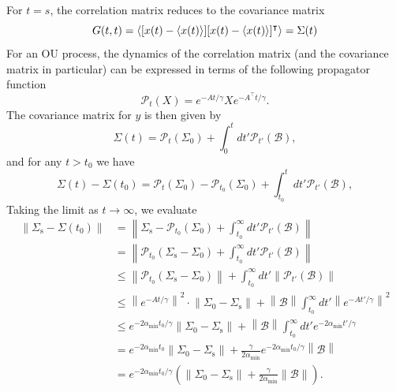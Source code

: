 \documentclass[prx,onecolumn,floatfix,longbibliography,notitlepage, nofootinbib,12pt]{revtex4-2}
\renewcommand{\leq}{\leqslant}
\begin{document}
\begin{appendix}
For $t=s$, the correlation matrix reduces to the covariance matrix
\begin{equation}
    G(t,t) = \braket{[x(t) - \braket{x(t)}][x(t) - \braket{x(t)}]^\intercal} = \Sigma(t)
\end{equation}
For an OU process, the dynamics of the correlation matrix (and the covariance matrix in particular) can be expressed in terms of the following propagator function
\begin{equation}
    \mathcal{P}_t(X) = e^{-A t/\gamma} X e^{-A^\intercal t/\gamma}.
\end{equation}
The covariance matrix for $y$ is then given by
\begin{equation}
\label{sigma-time-dep-app}
    \Sigma(t) = \mathcal{P}_t(\Sigma_0) + \int_0^t dt' \mathcal{P}_{t'} (\mathcal{B}),
\end{equation}
and for any $t > t_0$ we have
\begin{equation}
\label{sigma-error-time-dep-app}
    \Sigma(t) - \Sigma(t_0)=\mathcal{P}_{t}(\Sigma_0) -\mathcal{P}_{t_0}(\Sigma_0) + \int_{t_0}^{t} dt' \mathcal{P}_{t'} (\mathcal{B}),
\end{equation}
Taking the limit as $t \to \infty$, we evaluate
\begin{align}
    \left\|\Sigma_\text{s} - \Sigma(t_0) \right\| &= \left\| \Sigma_\text{s} -\mathcal{P}_{t_0}(\Sigma_0) + \int_{t_0}^{\infty} dt' \mathcal{P}_{t'} (\mathcal{B})\right\| \\
    & =  \left\|\mathcal{P}_{t_0}( \Sigma_\text{s} - \Sigma_0) + \int_{t_0}^{\infty} dt' \mathcal{P}_{t'} (\mathcal{B})\right\| \\
    & \leq
 \left\| \mathcal{P}_{t_0} (\Sigma_\text{s} - \Sigma_0) \right\|+ \int_{t_0}^\infty dt' \left\| \mathcal{P}_{t'}(\mathcal{B})\right\|\\
 & \leq 
  \left\| e^{-A t/\gamma}\right\|^2 \cdot \left\| \Sigma_0 - \Sigma_\text{s}\right\|+ \left\|\mathcal{B}\right\|\int_{t_0}^\infty dt' \left\| e^{-A t'/\gamma}\right\|^2 \\
  & \leq     e^{- 2\alpha_\text{min} t_0/\gamma }\left\| \Sigma_0 - \Sigma_\text{s}\right\|+ \left\|\mathcal{B}\right\|\int_{t_0}^\infty dt' e^{-2 \alpha_\text{min} t'/\gamma} \\
  & =  e^{- 2\alpha_\text{min} t_0 }\left\| \Sigma_0 - \Sigma_\text{s}\right\|+\frac{\gamma}{2\alpha_\text{min}}e^{-2 \alpha_\text{min}t_0/\gamma} \left\|\mathcal{B}\right\| \\
  & =  e^{- 2\alpha_\text{min} t_0/\gamma }\left(\left\| \Sigma_0 - \Sigma_\text{s}\right\|+\frac{\gamma}{2  \alpha_\text{min}}\|\mathcal{B}\|\right).

\end{align}
\end{appendix}
\end{document}
